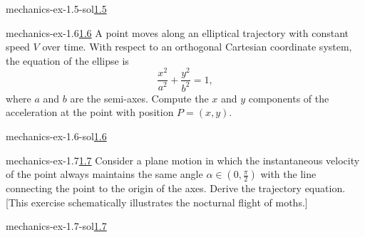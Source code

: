 \documentclass[preview]{standalone}
\begin{document}
\begin{snippetsolution}{mechanics-ex-1.5-sol}{\underline{1.5}}
    \todo
\end{snippetsolution}

\begin{snippetexercise}{mechanics-ex-1.6}{\underline{1.6}}
    A point moves along an elliptical trajectory with constant speed \( V \) over time. With respect to an orthogonal Cartesian coordinate system, the equation of the ellipse is
    \[
    \frac{x^2}{a^2} + \frac{y^2}{b^2} = 1,
    \]
    where \( a \) and \( b \) are the semi-axes. Compute the \( x \) and \( y \) components of the acceleration at the point with position \( P = (x, y) \).
\end{snippetexercise}

\begin{snippetsolution}{mechanics-ex-1.6-sol}{\underline{1.6}}
    \todo
\end{snippetsolution}

\begin{snippetexercise}{mechanics-ex-1.7}{\underline{1.7}}
    Consider a plane motion in which the instantaneous velocity of the point always maintains the same angle \( \alpha \in (0, \frac{\pi}{2}) \) with the line connecting the point to the origin of the axes. Derive the trajectory equation. [This exercise schematically illustrates the nocturnal flight of moths.]
\end{snippetexercise}

\begin{snippetsolution}{mechanics-ex-1.7-sol}{\underline{1.7}}
    \todo
\end{snippetsolution}
\end{document}
